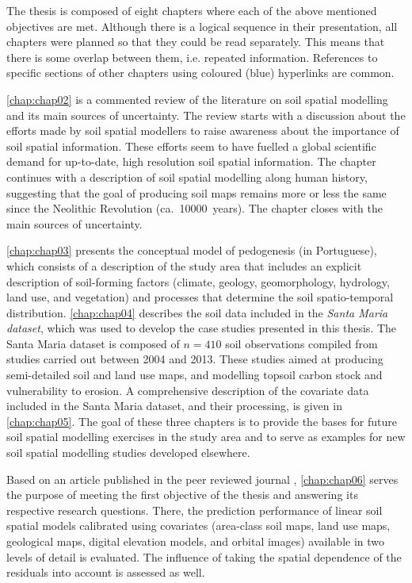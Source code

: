 The thesis is composed of eight chapters where each of the above mentioned objectives are met. Although there 
is a logical sequence in their presentation, all chapters were planned so that they could be read separately. 
This means that there is some overlap between them, i.e. repeated information. References to specific sections 
of other chapters using coloured (blue) hyperlinks are common.

\autoref{chap:chap02} is a commented review of the literature on soil spatial modelling and its main sources 
of uncertainty. The review starts with a discussion about the efforts made by soil spatial modellers to 
raise awareness about the importance of soil spatial information. These efforts seem to have fuelled a global 
scientific demand for up-to-date, high resolution soil spatial information. The chapter continues with a 
description of soil spatial modelling along human history, suggesting that the goal of producing soil maps 
remains more or less the same since the Neolithic Revolution (ca.~\num{10000}~years). The chapter closes with 
the main sources of uncertainty.

\autoref{chap:chap03} presents the conceptual model of pedogenesis (in Portuguese), which consists of a 
description of the study area that includes an explicit description of soil-forming factors (climate, geology, 
geomorphology, hydrology, land use, and vegetation) and processes that determine the soil spatio-temporal 
distribution. \autoref{chap:chap04} describes the soil data included in the \emph{Santa Maria dataset}, which 
was used to develop the case studies presented in this thesis. The Santa Maria dataset is composed of 
$n = 410$ soil observations compiled from studies carried out between \num{2004} and \num{2013}. These studies 
aimed at producing semi-detailed soil and land use maps, and modelling topsoil carbon stock and vulnerability 
to erosion. A comprehensive description of the covariate data included in the Santa Maria dataset, and their 
processing, is given in \autoref{chap:chap05}. The goal of these three chapters is to provide the bases for 
future soil spatial modelling exercises in the study area and to serve as examples for new soil spatial 
modelling studies developed elsewhere.

Based on an article published in the peer reviewed journal \geoderma, \autoref{chap:chap06} serves the purpose 
of meeting the first objective of the thesis and answering its respective research questions. There, the 
prediction performance of linear soil spatial models calibrated using covariates (area-class soil maps, land 
use maps, geological maps, digital elevation models, and orbital images) available in two levels of detail is 
evaluated. The influence of taking the spatial dependence of the residuals into account is assessed as well. 

